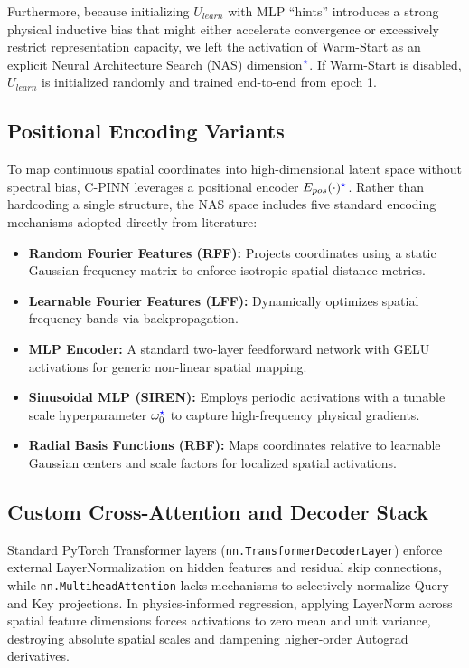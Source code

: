 Furthermore, because initializing $U_{learn}$ with MLP ``hints'' introduces a strong physical inductive bias that might either accelerate convergence or excessively restrict representation capacity, we left the activation of Warm-Start as an explicit Neural Architecture Search (NAS) dimension$^{\textcolor{blue}{\star}}$. If Warm-Start is disabled, $U_{learn}$ is initialized randomly and trained end-to-end from epoch 1.

\subsection{Positional Encoding Variants}
To map continuous spatial coordinates into high-dimensional latent space without spectral bias, C-PINN leverages a positional encoder $E_{pos}(\cdot)^{\textcolor{blue}{\star}}$. Rather than hardcoding a single structure, the NAS space includes five standard encoding mechanisms adopted directly from literature:
\begin{itemize}
    \item \textbf{Random Fourier Features (RFF):} Projects coordinates using a static Gaussian frequency matrix to enforce isotropic spatial distance metrics.
    \item \textbf{Learnable Fourier Features (LFF):} Dynamically optimizes spatial frequency bands via backpropagation.
    \item \textbf{MLP Encoder:} A standard two-layer feedforward network with GELU activations for generic non-linear spatial mapping.
    \item \textbf{Sinusoidal MLP (SIREN):} Employs periodic activations with a tunable scale hyperparameter $\omega_0^{\textcolor{blue}{\star}}$ to capture high-frequency physical gradients.
    \item \textbf{Radial Basis Functions (RBF):} Maps coordinates relative to learnable Gaussian centers and scale factors for localized spatial activations.
\end{itemize}

\subsection{Custom Cross-Attention and Decoder Stack}
Standard PyTorch Transformer layers (\texttt{nn.TransformerDecoderLayer}) enforce external LayerNormalization on hidden features and residual skip connections, while \texttt{nn.MultiheadAttention} lacks mechanisms to selectively normalize Query and Key projections. In physics-informed regression, applying LayerNorm across spatial feature dimensions forces activations to zero mean and unit variance, destroying absolute spatial scales and dampening higher-order Autograd derivatives.

